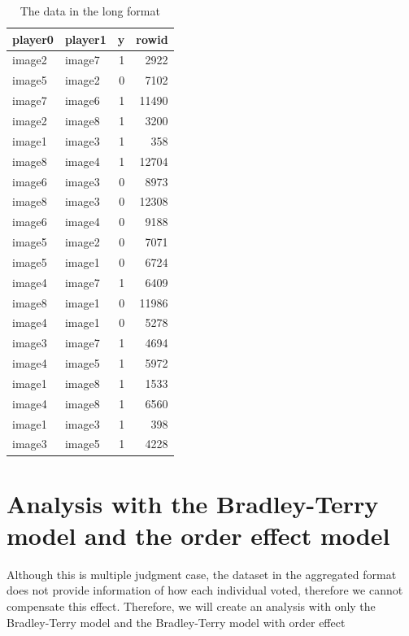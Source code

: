 \documentclass[
]{book}
\begin{document}
\begin{table}

\caption{\label{tab:unnamed-chunk-20}The data in the long format}
\centering
\begin{tabular}[t]{l|l|r|r}
\hline
player0 & player1 & y & rowid\\
\hline
image2 & image7 & 1 & 2922\\
\hline
image5 & image2 & 0 & 7102\\
\hline
image7 & image6 & 1 & 11490\\
\hline
image2 & image8 & 1 & 3200\\
\hline
image1 & image3 & 1 & 358\\
\hline
image8 & image4 & 1 & 12704\\
\hline
image6 & image3 & 0 & 8973\\
\hline
image8 & image3 & 0 & 12308\\
\hline
image6 & image4 & 0 & 9188\\
\hline
image5 & image2 & 0 & 7071\\
\hline
image5 & image1 & 0 & 6724\\
\hline
image4 & image7 & 1 & 6409\\
\hline
image8 & image1 & 0 & 11986\\
\hline
image4 & image1 & 0 & 5278\\
\hline
image3 & image7 & 1 & 4694\\
\hline
image4 & image5 & 1 & 5972\\
\hline
image1 & image8 & 1 & 1533\\
\hline
image4 & image8 & 1 & 6560\\
\hline
image1 & image3 & 1 & 398\\
\hline
image3 & image5 & 1 & 4228\\
\hline
\end{tabular}
\end{table}

\hypertarget{analysis-with-the-bradley-terry-model-and-the-order-effect-model}{%
\section{Analysis with the Bradley-Terry model and the order effect model}\label{analysis-with-the-bradley-terry-model-and-the-order-effect-model}}

Although this is multiple judgment case, the dataset in the aggregated format does not provide information of how each individual voted, therefore we cannot compensate this effect. Therefore, we will create an analysis with only the Bradley-Terry model and the Bradley-Terry model with order effect
\end{document}
